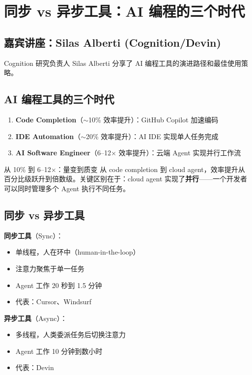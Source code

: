 \section{同步 vs 异步工具：AI 编程的三个时代}

\subsection{嘉宾讲座：Silas Alberti (Cognition/Devin)}

Cognition 研究负责人 Silas Alberti 分享了 AI 编程工具的演进路径和最佳使用策略。

\subsection{AI 编程工具的三个时代}

\begin{enumerate}
    \item \textbf{Code Completion}（$\sim$10\% 效率提升）：GitHub Copilot 加速编码
    \item \textbf{IDE Automation}（$\sim$20\% 效率提升）：AI IDE 实现单人任务完成
    \item \textbf{AI Software Engineer}（6--12$\times$ 效率提升）：云端 Agent 实现并行工作流
\end{enumerate}

\begin{importantbox}{从 10\% 到 6--12$\times$：量变到质变}
从 code completion 到 cloud agent，效率提升从百分比级跃升到倍数级。关键区别在于：cloud agent 实现了\textbf{并行}——一个开发者可以同时管理多个 Agent 执行不同任务。
\end{importantbox}

\subsection{同步 vs 异步工具}

\textbf{同步工具}（Sync）：
\begin{itemize}
    \item 单线程，人在环中（human-in-the-loop）
    \item 注意力聚焦于单一任务
    \item Agent 工作 20 秒到 1.5 分钟
    \item 代表：Cursor、Windsurf
\end{itemize}

\textbf{异步工具}（Async）：
\begin{itemize}
    \item 多线程，人类委派任务后切换注意力
    \item Agent 工作 10 分钟到数小时
    \item 代表：Devin
\end{itemize}

